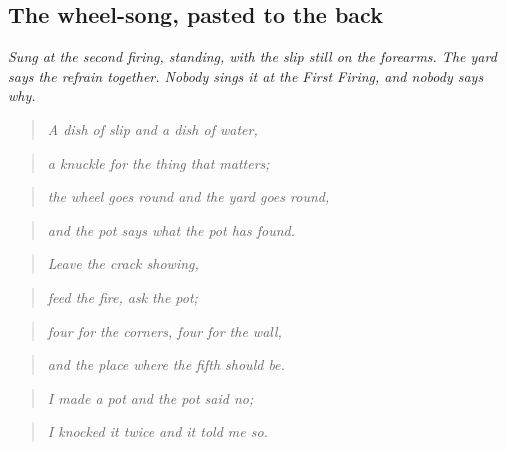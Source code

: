\documentclass{design/chronicle}
\begin{document}
\subsection*{The wheel-song, pasted to the back}

\emph{Sung at the second firing, standing, with the slip still on the forearms. The yard says the refrain together. Nobody sings it at the First Firing, and nobody says why.}

\begin{quote}\itshape A dish of slip and a dish of water,\end{quote}

\begin{quote}\itshape a knuckle for the thing that matters;\end{quote}

\begin{quote}\itshape the wheel goes round and the yard goes round,\end{quote}

\begin{quote}\itshape and the pot says what the pot has found.\end{quote}

\begin{quote}\itshape \end{quote}

\begin{quote}\itshape Leave the crack showing,\end{quote}

\begin{quote}\itshape feed the fire, ask the pot;\end{quote}

\begin{quote}\itshape four for the corners, four for the wall,\end{quote}

\begin{quote}\itshape and the place where the fifth should be.\end{quote}

\begin{quote}\itshape \end{quote}

\begin{quote}\itshape I made a pot and the pot said no;\end{quote}

\begin{quote}\itshape I knocked it twice and it told me so.\end{quote}
\end{document}
